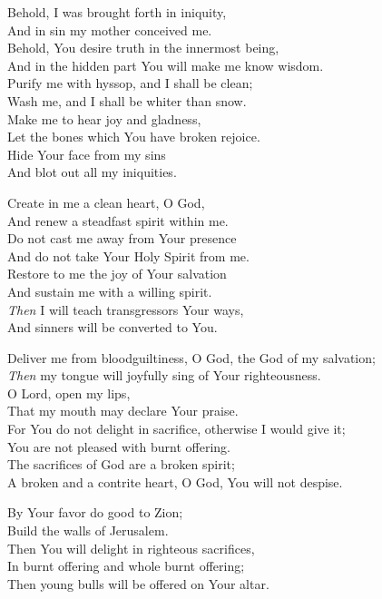 \documentclass[14pt]{extbook}
\begin{document}
\newpage
Behold, I was brought forth in iniquity,\\
And in sin my mother conceived me.\\
Behold, You desire truth in the innermost being,\\
And in the hidden part You will make me know wisdom.\\
Purify me with hyssop, and I shall be clean;\\
Wash me, and I shall be whiter than snow.\\
Make me to hear joy and gladness,\\
Let the bones which You have broken rejoice.\\
Hide Your face from my sins\\
And blot out all my iniquities.

Create in me a clean heart, O God,\\
And renew a steadfast spirit within me.\\
Do not cast me away from Your presence\\
And do not take Your Holy Spirit from me.\\
Restore to me the joy of Your salvation\\
And sustain me with a willing spirit.\\
\emph{Then} I will teach transgressors Your ways,\\
And sinners will be converted to You.

Deliver me from bloodguiltiness, O God, the God of my salvation;\\
\emph{Then} my tongue will joyfully sing of Your righteousness.\\
O Lord, open my lips,\\
That my mouth may declare Your praise.\\
For You do not delight in sacrifice, otherwise I would give it;\\
You are not pleased with burnt offering.\\
The sacrifices of God are a broken spirit;\\
A broken and a contrite heart, O God, You will not despise.

By Your favor do good to Zion;\\
Build the walls of Jerusalem.\\
Then You will delight in righteous sacrifices,\\
In burnt offering and whole burnt offering;\\
Then young bulls will be offered on Your altar.
\end{document}
